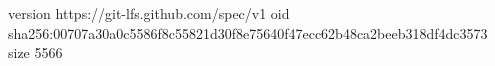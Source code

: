 version https://git-lfs.github.com/spec/v1
oid sha256:00707a30a0c5586f8c55821d30f8e75640f47ecc62b48ca2beeb318df4dc3573
size 5566
